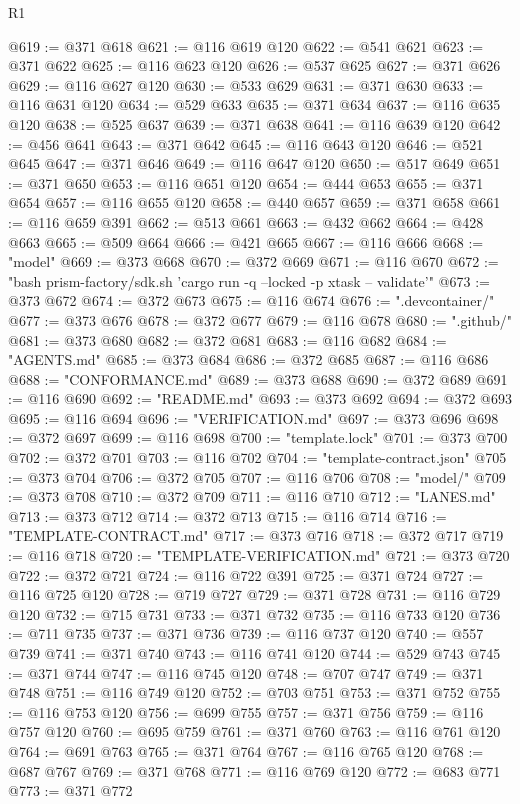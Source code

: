 \begin{lexlean}{R1}
\begin{coremodule}
@619 := @371 @618
@621 := @116 @619 @120
@622 := @541 @621
@623 := @371 @622
@625 := @116 @623 @120
@626 := @537 @625
@627 := @371 @626
@629 := @116 @627 @120
@630 := @533 @629
@631 := @371 @630
@633 := @116 @631 @120
@634 := @529 @633
@635 := @371 @634
@637 := @116 @635 @120
@638 := @525 @637
@639 := @371 @638
@641 := @116 @639 @120
@642 := @456 @641
@643 := @371 @642
@645 := @116 @643 @120
@646 := @521 @645
@647 := @371 @646
@649 := @116 @647 @120
@650 := @517 @649
@651 := @371 @650
@653 := @116 @651 @120
@654 := @444 @653
@655 := @371 @654
@657 := @116 @655 @120
@658 := @440 @657
@659 := @371 @658
@661 := @116 @659 @391
@662 := @513 @661
@663 := @432 @662
@664 := @428 @663
@665 := @509 @664
@666 := @421 @665
@667 := @116 @666
@668 := "model"
@669 := @373 @668
@670 := @372 @669
@671 := @116 @670
@672 := "bash prism-factory/sdk.sh 'cargo run -q --locked -p xtask -- validate'"
@673 := @373 @672
@674 := @372 @673
@675 := @116 @674
@676 := ".devcontainer/"
@677 := @373 @676
@678 := @372 @677
@679 := @116 @678
@680 := ".github/"
@681 := @373 @680
@682 := @372 @681
@683 := @116 @682
@684 := "AGENTS.md"
@685 := @373 @684
@686 := @372 @685
@687 := @116 @686
@688 := "CONFORMANCE.md"
@689 := @373 @688
@690 := @372 @689
@691 := @116 @690
@692 := "README.md"
@693 := @373 @692
@694 := @372 @693
@695 := @116 @694
@696 := "VERIFICATION.md"
@697 := @373 @696
@698 := @372 @697
@699 := @116 @698
@700 := "template.lock"
@701 := @373 @700
@702 := @372 @701
@703 := @116 @702
@704 := "template-contract.json"
@705 := @373 @704
@706 := @372 @705
@707 := @116 @706
@708 := "model/"
@709 := @373 @708
@710 := @372 @709
@711 := @116 @710
@712 := "LANES.md"
@713 := @373 @712
@714 := @372 @713
@715 := @116 @714
@716 := "TEMPLATE-CONTRACT.md"
@717 := @373 @716
@718 := @372 @717
@719 := @116 @718
@720 := "TEMPLATE-VERIFICATION.md"
@721 := @373 @720
@722 := @372 @721
@724 := @116 @722 @391
@725 := @371 @724
@727 := @116 @725 @120
@728 := @719 @727
@729 := @371 @728
@731 := @116 @729 @120
@732 := @715 @731
@733 := @371 @732
@735 := @116 @733 @120
@736 := @711 @735
@737 := @371 @736
@739 := @116 @737 @120
@740 := @557 @739
@741 := @371 @740
@743 := @116 @741 @120
@744 := @529 @743
@745 := @371 @744
@747 := @116 @745 @120
@748 := @707 @747
@749 := @371 @748
@751 := @116 @749 @120
@752 := @703 @751
@753 := @371 @752
@755 := @116 @753 @120
@756 := @699 @755
@757 := @371 @756
@759 := @116 @757 @120
@760 := @695 @759
@761 := @371 @760
@763 := @116 @761 @120
@764 := @691 @763
@765 := @371 @764
@767 := @116 @765 @120
@768 := @687 @767
@769 := @371 @768
@771 := @116 @769 @120
@772 := @683 @771
@773 := @371 @772

\end{coremodule}
\end{lexlean}
